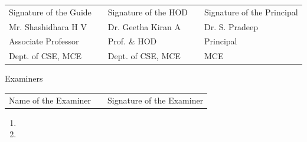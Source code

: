 \begin{table}[h]
\centering
\begin{tabular}{lllll}
Signature of the Guide & & Signature of the HOD & & Signature of the Principal \\
Mr. Shashidhara H V  & & 	Dr. Geetha Kiran A & & Dr. S. Pradeep  \\ 
Associate Professor & &  Prof. \& HOD & & Principal \\
Dept. of CSE, MCE & & Dept. of CSE, MCE & & MCE
\end{tabular}
\end{table}
\vspace{0.5cm}
\begin{center}
Examiners
\end{center}
\vspace{-0.75cm}
\begin{table}[h]
\centering
\begin{tabular}{lll}
Name of the Examiner & \hspace{4cm}  & Signature of the Examiner
\end{tabular}
\end{table}
\vspace{-0.75cm}
\begin{enumerate}
\item  \vspace{0.25cm}
\item
\end{enumerate}
